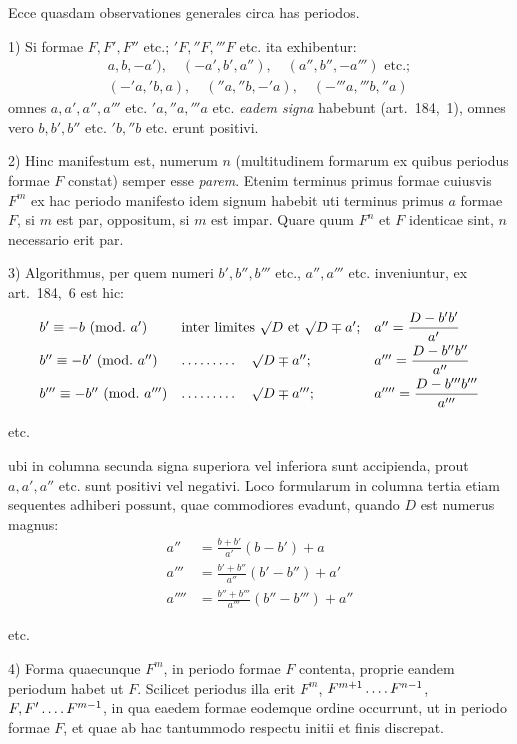 Ecce quasdam observationes generales circa has periodos.

1) Si formae $F,F',F''$ etc.; ${}'F,{}''F,{}'''F$ etc. ita exhibentur:
\[
\begin{gathered}
{a,b,-a')},\quad (-a',b',a''),\quad (a'',b'',-a''')\text{ etc.};\\
(-{}'a,{}'b,a),\quad ({}''a,{}''b,-{}'a),\quad (-{}'''a,{}'''b,{}''a)
\end{gathered}
\]
omnes $a,a',a'',a'''$ etc. ${}'a,{}''a,{}'''a$ etc. \textit{eadem signa} habebunt (art.~184,~1), omnes vero $b,b',b''$ etc. ${}'b,{}''b$ etc. erunt positivi.

2) Hinc manifestum est, numerum $n$ (multitudinem formarum ex quibus periodus formae $F$ constat) semper esse \textit{parem}. Etenim terminus primus formae cuiusvis $F^m$ ex hac periodo manifesto idem signum habebit uti terminus primus $a$ formae $F$, si $m$ est par, oppositum, si $m$ est impar. Quare quum $F^n$ et $F$ identicae sint, $n$ necessario erit par.

3) Algorithmus, per quem numeri $b',b'',b'''$ etc., $a'',a'''$ etc. inveniuntur, ex art.~184,~6 est hic:
\[
\begin{array}{lll}
b'\equiv-b\ (\mathrm{mod.}\ a')&\text{inter limites }\surd D\text{ et }\surd D\mp a';&a''=\dfrac{D-b'b'}{a'}\\[6pt]
b''\equiv-b'\ (\mathrm{mod.}\ a'')&\mathinner{\ldotp\ldotp\ldotp\ldotp\ldotp\ldotp\ldotp\ldotp\ldotp}\quad\surd D\mp a'';&a'''=\dfrac{D-b''b''}{a''}\\[6pt]
b'''\equiv-b''\ (\mathrm{mod.}\ a''')&\mathinner{\ldotp\ldotp\ldotp\ldotp\ldotp\ldotp\ldotp\ldotp\ldotp}\quad\surd D\mp a''';&a''''=\dfrac{D-b'''b'''}{a'''}
\end{array}
\]
\centerline{etc.}
ubi in columna secunda signa superiora vel inferiora sunt accipienda, prout $a,a',a''$ etc. sunt positivi vel negativi. Loco formularum in columna tertia etiam sequentes adhiberi possunt, quae commodiores evadunt, quando $D$ est numerus magnus:
\[
\begin{aligned}
a''&=\frac{b+b'}{a'}(b-b')+a\\
a'''&=\frac{b'+b''}{a''}(b'-b'')+a'\\
a''''&=\frac{b''+b'''}{a'''}({b''}-b''')+a''
\end{aligned}
\]
\centerline{etc.}

4) Forma quaecunque $F^m$, in periodo formae $F$ contenta, proprie eandem periodum habet ut $F$. Scilicet periodus illa erit $F^m$, $F^{m+1}\mathinner{\ldotp\ldotp\ldotp\ldotp} F^{n-1}$, $F,F'\mathinner{\ldotp\ldotp\ldotp\ldotp} F^{m-1}$, in qua eaedem formae eodemque ordine occurrunt, ut in periodo formae $F$, et quae ab hac tantummodo respectu initii et finis discrepat.


